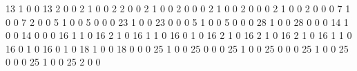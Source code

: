 13
1
0
0
13
2
0
0
2
1
0
0
2
2
0
0
2
1
0
0
2
0
0
0
2
1
0
0
2
0
0
0
2
1
0
0
2
0
0
0
7
1
0
0
7
2
0
0
5
1
0
0
5
0
0
0
23
1
0
0
23
0
0
0
5
1
0
0
5
0
0
0
28
1
0
0
28
0
0
0
14
1
0
0
14
0
0
0
16
1
1
0
16
2
1
0
16
1
1
0
16
0
1
0
16
2
1
0
16
2
1
0
16
2
1
0
16
1
1
0
16
0
1
0
16
0
1
0
18
1
0
0
18
0
0
0
25
1
0
0
25
0
0
0
25
1
0
0
25
0
0
0
25
1
0
0
25
0
0
0
25
1
0
0
25
2
0
0
